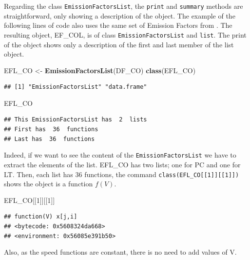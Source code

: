 \documentclass[12pt,graybox,envcountchap,sectrefs]{krantz}
\makeatletter
\newenvironment{Shaded}{\begin{snugshade}}{\end{snugshade}}
\newcommand{\KeywordTok}[1]{\textcolor[rgb]{0.13,0.29,0.53}{\textbf{#1}}}
\newcommand{\DecValTok}[1]{\textcolor[rgb]{0.00,0.00,0.81}{#1}}
\newcommand{\StringTok}[1]{\textcolor[rgb]{0.31,0.60,0.02}{#1}}
\newcommand{\NormalTok}[1]{#1}
\newenvironment{kframe}{%
\medskip{}
\setlength{\fboxsep}{.8em}
 \def\at@end@of@kframe{}%
 \ifinner\ifhmode%
  \def\at@end@of@kframe{\end{minipage}}%
  \begin{minipage}{\columnwidth}%
 \fi\fi%
 \def\FrameCommand##1{\hskip\@totalleftmargin \hskip-\fboxsep
 \colorbox{shadecolor}{##1}\hskip-\fboxsep
     \hskip-\linewidth \hskip-\@totalleftmargin \hskip\columnwidth}%
 \MakeFramed {\advance\hsize-\width
   \@totalleftmargin\z@ \linewidth\hsize
   \@setminipage}}%
 {\par\unskip\endMakeFramed%
 \at@end@of@kframe}
\renewenvironment{Shaded}{\begin{kframe}}{\end{kframe}}
\theoremstyle{definition}
\theoremstyle{definition}
\theoremstyle{definition}
\theoremstyle{remark}
\makeatother
\begin{document}
Regarding the class \texttt{EmissionFactorsList}, the \texttt{print} and
\texttt{summary} methods are straightforward, only showing a description
of the object. The example of the following lines of code also uses the
same set of Emission Factors from \citet{CETESB2015}. The resulting
object, EF\_COL, is of class \texttt{EmissionFactorsList} and
\texttt{list}. The print of the object shows only a description of the
first and last member of the list object.

\begin{Shaded}
\begin{Highlighting}[]
\NormalTok{EFL_CO <-}\StringTok{ }\KeywordTok{EmissionFactorsList}\NormalTok{(DF_CO)}
\KeywordTok{class}\NormalTok{(EFL_CO)}
\end{Highlighting}
\end{Shaded}

\begin{verbatim}
## [1] "EmissionFactorsList" "data.frame"
\end{verbatim}

\begin{Shaded}
\begin{Highlighting}[]
\NormalTok{EFL_CO}
\end{Highlighting}
\end{Shaded}

\begin{verbatim}
## This EmissionFactorsList has  2  lists
## First has  36  functions
## Last has  36  functions
\end{verbatim}

Indeed, if we want to see the content of the
\texttt{EmissionFactorsList} we have to extract the elements of the
list. EFL\_CO has two lists; one for PC and one for LT. Then, each list
has 36 functions, the command
\texttt{class(EFL\_CO{[}{[}1{]}{]}{[}{[}1{]}{]})} shows the object is a
function \(f(V)\).

\begin{Shaded}
\begin{Highlighting}[]
\NormalTok{EFL_CO[[}\DecValTok{1}\NormalTok{]][[}\DecValTok{1}\NormalTok{]]}
\end{Highlighting}
\end{Shaded}

\begin{verbatim}
## function(V) x[j,i]
## <bytecode: 0x5608324da668>
## <environment: 0x56085e391b50>
\end{verbatim}

Also, as the speed functions are constant, there is no need to add
values of V.
\end{document}
